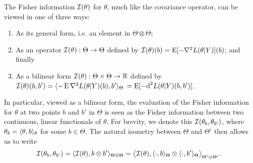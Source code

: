The Fisher information ${\mathcal I}(\theta)$ for $\theta$, much like the covariance operator, can be viewed in one of three ways: 
\begin{enumerate}
  \item As its general form, i.e. an element in $\Theta\otimes\Theta$;
  \item As an operator ${\mathcal I}(\theta):\Theta\to\Theta$ defined by ${\mathcal I}(\theta)(b) = \operatorname{E}[- \nabla^2 L(\theta|Y)](b)$; and finally
  \item As a bilinear form ${\mathcal I}(\theta):\Theta\times\Theta\to\mathbb{R}$ defined by ${\mathcal I}(\theta)(b,b') = \langle-\operatorname{E} \nabla^2 L(\theta|Y)(b), b'\rangle_\Theta$ $= \operatorname{E} [-\text{d}^2 L(\theta|Y)(b,b') ]$.
\end{enumerate}
In particular, viewed as a bilinear form, the evaluation of the Fisher information for $\theta$ at two points $b$ and $b'$ in $\Theta$ is seen as the Fisher information between two continuous, linear functionals of $\theta$.
For brevity, we denote this ${\mathcal I}(\theta_b,\theta_{b'})$, where $\theta_b = \langle\theta,b\rangle_\theta$ for some $b\in\Theta$.
The natural isometry between $\Theta$ and $\Theta'$ then allows us to write 
\begin{align}\label{eq:fisher-linear-functional}
  {\mathcal I}(\theta_b,\theta_{b'}) = \langle{\mathcal I}(\theta), b \otimes b'\rangle_{\Theta\otimes\Theta} = \big\langle{\mathcal I}(\theta), \langle\cdot,b\rangle_\Theta \otimes \langle\cdot,b'\rangle_\Theta \big\rangle_{\Theta'\otimes\Theta'}.
\end{align}


